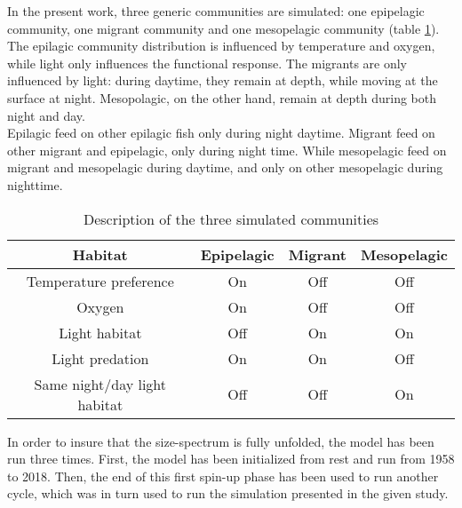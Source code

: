In the present work, three generic communities are simulated: one epipelagic community, one migrant community and one mesopelagic community (table \ref{t:com-habitat}). 
The epilagic community distribution is influenced by temperature and oxygen, while light only influences the functional response. The 
migrants are only influenced by light: during daytime, they remain at depth, while moving at the 
surface at night. Mesopolagic, on the other hand, remain at depth during both night and day.\\

Epilagic feed on other epilagic fish only during night daytime. Migrant feed on other migrant and epipelagic, only during night time. While mesopelagic feed on migrant and mesopelagic during daytime, and only on other mesopelagic during nighttime. \\

\begin{table}
\begin{tabular}{cccc}
     Habitat & Epipelagic & Migrant & Mesopelagic \\
     \hline
     \hline
      Temperature preference & On & Off & Off\\
      Oxygen & On & Off & Off \\
      Light habitat & Off & On & On \\
      Light predation & On & On & Off \\
      Same night/day light habitat  & Off & Off & On \\
\end{tabular}
\caption{Description of the three simulated communities}
\label{t:com-habitat}
\end{table}

In order to insure that the size-spectrum is fully unfolded, the model has been run three times. First, the model has been initialized from rest and run from 1958 to 2018. Then, the end of this first spin-up phase has been used to run another cycle, which was in turn used to run the simulation presented in the given study.
















